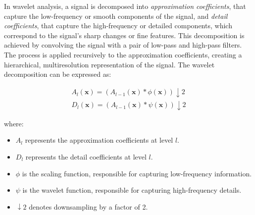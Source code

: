 
In wavelet analysis, a signal is decomposed into \textit{approximation coefficients}, that capture the low-frequency or smooth components of the signal, and \textit{detail coefficients}, that capture the high-frequency or detailed components, which correspond to the signal's sharp changes or fine features. This decomposition is achieved by convolving the signal with a pair of low-pass and high-pass filters. The process is applied recursively to the approximation coefficients, creating a hierarchical, multiresolution representation of the signal. The wavelet decomposition can be expressed as:

\begin{align}
  A_l(\mathbf{x}) = \left( A_{l-1}(\mathbf{x}) * \phi(\mathbf{x}) \right) \downarrow 2
  \\
  D_l(\mathbf{x}) = \left( A_{l-1}(\mathbf{x}) * \psi(\mathbf{x}) \right) \downarrow 2
\end{align}

where:
\begin{itemize}
  \item \( A_l \) represents the approximation coefficients at level \( l \).
  \item \( D_l \) represents the detail coefficients at level \( l \).
  \item \( \phi \) is the scaling function, responsible for capturing low-frequency information.
  \item \( \psi \) is the wavelet function, responsible for capturing high-frequency details.
  \item \( \downarrow 2 \) denotes downsampling by a factor of 2.
\end{itemize}


